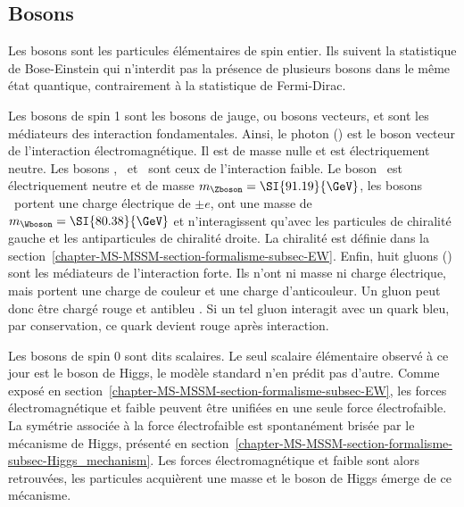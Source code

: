 \subsection{Bosons}\label{chapter-MS-MSSM-section-SM_ptcs-subsec-bosons}
Les bosons sont les particules élémentaires de spin entier.
Ils suivent la statistique de Bose-Einstein qui n'interdit pas la présence de plusieurs bosons dans le même état quantique, contrairement à la statistique de Fermi-Dirac.
\par
Les bosons de spin 1 sont les bosons de jauge, ou bosons vecteurs, et sont les médiateurs des interaction fondamentales.
Ainsi, le photon (\photon) est le boson vecteur de l'interaction électromagnétique. Il est de masse nulle et est électriquement neutre.
Les bosons \Wbosonplus, \Wbosonminus\ et \Zboson\ sont ceux de l'interaction faible. Le boson \Zboson\ est électriquement neutre et de masse $m_\Zboson=\SI{91.19}{\GeV}$, les bosons \Wboson\ portent une charge électrique de $\pm e$, ont une masse de $m_\Wboson=\SI{80.38}{\GeV}$ et n'interagissent qu'avec les particules de chiralité gauche et les antiparticules de chiralité droite.
La chiralité est définie dans la section~\ref{chapter-MS-MSSM-section-formalisme-subsec-EW}.
Enfin, huit gluons (\gluon) sont les médiateurs de l'interaction forte. Ils n'ont ni masse ni charge électrique, mais portent une charge de couleur et une charge d'anticouleur. Un gluon peut donc être chargé \og rouge et antibleu \fg{}. Si un tel gluon interagit avec un quark bleu, par conservation, ce quark devient rouge après interaction.
\par
Les bosons de spin 0 sont dits scalaires.
Le seul scalaire élémentaire observé à ce jour est le boson de Higgs, le modèle standard n'en prédit pas d'autre.
Comme exposé en section~\ref{chapter-MS-MSSM-section-formalisme-subsec-EW},
les forces électromagnétique et faible peuvent être unifiées en une seule force électrofaible.
La symétrie associée à la force électrofaible est spontanément brisée
par le mécanisme de Higgs,
présenté en section~\ref{chapter-MS-MSSM-section-formalisme-subsec-Higgs_mechanism}.
Les forces électromagnétique et faible
sont alors retrouvées,
les particules acquièrent une masse
et le boson de Higgs émerge de ce mécanisme.

%
%
